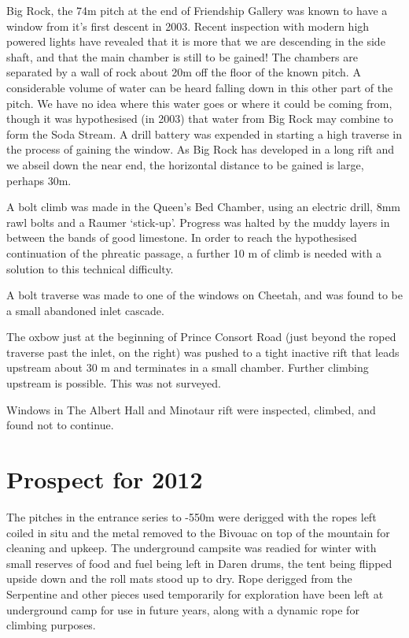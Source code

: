 Big Rock, the 74m pitch at the end of Friendship Gallery was known to
have a window from it's first descent in 2003. Recent inspection with
modern high powered lights have revealed that it is more that we are
descending in the side shaft, and that the main chamber is still to be
gained! The chambers are separated by a wall of rock about 20m off the
floor of the known pitch. A considerable volume of water can be heard
falling down in this other part of the pitch. We have no idea where this
water goes or where it could be coming from, though it was hypothesised
(in 2003) that water from Big Rock may combine to form the Soda Stream.
A drill battery was expended in starting a high traverse in the process
of gaining the window. As Big Rock has developed in a long rift and we
abseil down the near end, the horizontal distance to be gained is large,
perhaps 30m.

A bolt climb was made in the Queen's Bed Chamber, using an electric
drill, 8mm rawl bolts and a Raumer `stick-up'. Progress was halted by
the muddy layers in between the bands of good limestone. In order to
reach the hypothesised continuation of the phreatic passage, a further
10 m of climb is needed with a solution to this technical difficulty.

A bolt traverse was made to one of the windows on Cheetah, and was found
to be a small abandoned inlet cascade.

The oxbow just at the beginning of Prince Consort Road (just beyond the
roped traverse past the inlet, on the right) was pushed to a tight
inactive rift that leads upstream about 30 m and terminates in a small
chamber. Further climbing upstream is possible. This was not surveyed.

Windows in The Albert Hall and Minotaur rift were inspected, climbed,
and found not to continue.

\section{Prospect for 2012}

The pitches in the entrance series to -550m were derigged with the ropes
left coiled in situ and the metal removed to the Bivouac on top of the
mountain for cleaning and upkeep. The underground campsite was readied
for winter with small reserves of food and fuel being left in Daren
drums, the tent being flipped upside down and the roll mats stood up to
dry. Rope derigged from the Serpentine and other pieces used temporarily
for exploration have been left at underground camp for use in future
years, along with a dynamic rope for climbing purposes.

